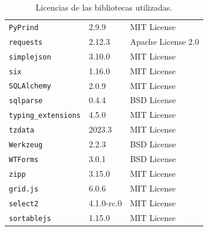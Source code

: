 \begin{table}
\begin{tabular}{|l|p{}|p{}|}
\texttt{PyPrind} & 2.9.9 & MIT License \\
\texttt{requests} & 2.12.3 & Apache License 2.0 \\
\texttt{simplejson} & 3.10.0 & MIT License \\
\texttt{six} & 1.16.0 & MIT License \\
\texttt{SQLAlchemy} & 2.0.9 & MIT License \\
\texttt{sqlparse} & 0.4.4 & BSD License \\
\texttt{typing\_extensions} & 4.5.0 & MIT License \\
\texttt{tzdata} & 2023.3 & MIT License \\
\texttt{Werkzeug} & 2.2.3 & BSD License \\
\texttt{WTForms} & 3.0.1 & BSD License \\
\texttt{zipp} & 3.15.0 & MIT License \\
\texttt{grid.js} & 6.0.6 & MIT License \\
\texttt{select2} & 4.1.0-rc.0 & MIT License \\
\texttt{sortablejs} & 1.15.0 & MIT License \\
\hline
\end{tabular}
\caption{Licencias de las bibliotecas utilizadas.}\label{table-A:licencias}
\end{table}

